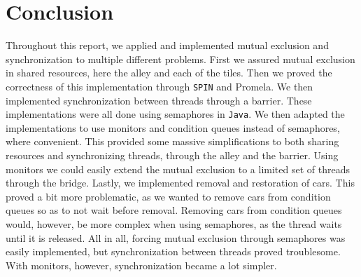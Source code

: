 \section{Conclusion}
Throughout this report, we applied and implemented mutual exclusion and synchronization to multiple different problems. First we assured mutual exclusion in shared resources, here the alley and each of the tiles. Then we proved the correctness of this implementation through \texttt{SPIN} and Promela. We then implemented synchronization between threads through a barrier. These implementations were all done using semaphores in \texttt{Java}. We then adapted the implementations to use monitors and condition queues instead of semaphores, where convenient. This provided some massive simplifications to both sharing resources and synchronizing threads, through the alley and the barrier. Using monitors we could easily extend the mutual exclusion to a limited set of threads through the bridge. Lastly, we implemented removal and restoration of cars. This proved a bit more problematic, as we wanted to remove cars from condition queues so as to not wait before removal. Removing cars from condition queues would, however, be more complex when using semaphores, as the thread waits until it is released. All in all, forcing mutual exclusion through semaphores was easily implemented, but synchronization between threads proved troublesome. With monitors, however, synchronization became a lot simpler.